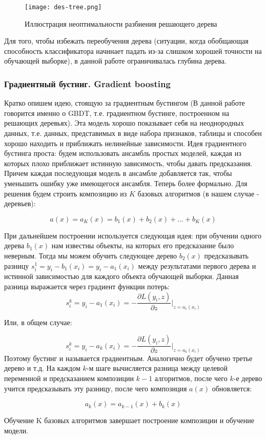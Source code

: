 \begin{figure}[H]
    \centering
    \texttt{[image: des-tree.png]}
    \caption{Иллюстрация неоптимальности разбиения решающего дерева \cite{SHAD-trees}}
\end{figure}

Для того, чтобы избежать переобучения дерева (ситуации, когда обобщающая способность классификатора начинает падать из-за слишком хорошей точности на обучающей выборке), в данной работе ограничивалась глубина дерева.

\subsubsection{Градиентный бустниг. Gradient boosting}
Кратко опишем идею, стоящую за градиентным бустингом (В данной работе говорится именно о GBDT, т.е. градиентном бустинге, построенном на решающих деревьях). Эта модель хорошо показывает себя на неоднородных данных, т.е. данных, представимых в виде набора признаков, таблицы и способен хорошо находить и приближать нелинейные зависимости. Идея градиентного бустинга проста: будем использовать ансамбль простых моделей, каждая из которых плохо приближает истинную зависимость, чтобы давать предсказания. Причем каждая последующая модель в ансамбле добавляется так, чтобы уменьшить ошибку уже имеющегося ансамбля. Теперь более формально. Для решения будем строить композицию из $K$ базовых алгоритмов (в нашем случае - деревьев):

\[ a(x)= a_K(x) = b_1(x) + b_2(x) + ... + b_K(x) \]

При дальнейшем построении используется следующая идея: при обучении одного дерева $b_1(x)$ нам известны объекты, на которых его предсказание было неверным. Тогда мы можем обучить следующее дерево $b_2(x)$ предсказывать разницу $s_i^1 = y_i - b_1(x_i) = y_i - a_1(x_i)$ между результатами первого дерева и истинной зависимостью для каждого объекта обучающей выборки. Данная разница выражается через градиент функции потерь:
\[ s_i^k = y_i - a_1(x_i) = -\dfrac{\partial L(y_i, z)}{\partial z} |_{z = a_1(x_i)} \]

Или, в общем случае:

\[ s_i^k = y_i - a_k(x_i) = -\dfrac{\partial L(y_i, z)}{\partial z} |_{z = a_k(x_i)} \]
Поэтому бустинг и называется градиентным. Аналогично будет обучено третье дерево и т.д. На каждом $k$-м шаге вычисляется разница между целевой переменной и предсказанием композиции $k - 1$ алгоритмов, после чего $k$-е дерево учится предсказывать эту разницу, после чего композиция $a(x)$ обновляется:

\[ a_k(x) = a_{k-1}(x) + b_k(x) \]

Обучение K базовых алгоритмов завершает построение композиции и обучение модели.


\newpage
